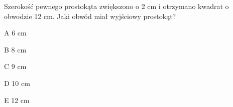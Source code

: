 \begin{tresc}
Szerokość pewnego prostokąta zwiększono o 2 cm i otrzymano kwadrat o obwodzie 12 cm. Jaki obwód miał wyjściowy prostokąt?
\end{tresc}
\begin{wariant}{A} 6 cm \end{wariant}
\begin{wariant}{B} 8 cm \end{wariant}
\begin{wariant}{C} 9 cm \end{wariant}
\begin{wariant}{D} 10 cm \end{wariant}
\begin{wariant}{E} 12 cm \end{wariant}
